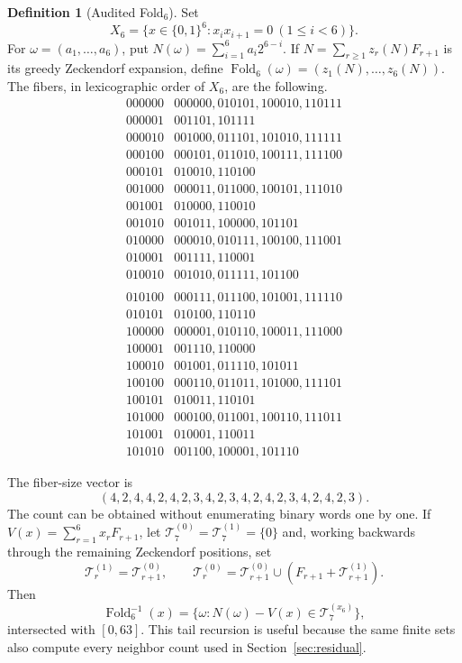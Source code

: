\documentclass[12pt,a4paper]{article}
\theoremstyle{plain}
\theoremstyle{definition}
\newtheorem{definition}[theorem]{Definition}
\numberwithin{equation}{section}
\newcommand{\Fold}{\operatorname{Fold}}
\begin{document}
\begin{definition}[Audited Fold$_6$]\label{def:fold6}
Set
\[
X_6=\{x\in\{0,1\}^6:x_ix_{i+1}=0\ (1\le i<6)\}.
\]
For \(\omega=(a_1,\ldots,a_6)\), put
\(N(\omega)=\sum_{i=1}^6a_i2^{6-i}\).  If
\(N=\sum_{r\ge1}z_r(N)F_{r+1}\) is its greedy Zeckendorf expansion, define
\(\Fold_6(\omega)=(z_1(N),\ldots,z_6(N))\).  The fibers, in lexicographic order of
\(X_6\), are the following.
\[
\begin{array}{c|l}
000000&000000,010101,100010,110111\\
000001&001101,101111\\
000010&001000,011101,101010,111111\\
000100&000101,011010,100111,111100\\
000101&010010,110100\\
001000&000011,011000,100101,111010\\
001001&010000,110010\\
001010&001011,100000,101101\\
010000&000010,010111,100100,111001\\
010001&001111,110001\\
010010&001010,011111,101100\\
\end{array}
\]
\[
\begin{array}{c|l}
010100&000111,011100,101001,111110\\
010101&010100,110110\\
100000&000001,010110,100011,111000\\
100001&001110,110000\\
100010&001001,011110,101011\\
100100&000110,011011,101000,111101\\
100101&010011,110101\\
101000&000100,011001,100110,111011\\
101001&010001,110011\\
101010&001100,100001,101110
\end{array}
\]
\end{definition}

The fiber-size vector is
\[
(4,2,4,4,2,4,2,3,4,2,3,4,2,4,2,3,4,2,4,2,3).
\]
The count can be obtained without enumerating binary words one by one.  If
\(V(x)=\sum_{r=1}^6x_rF_{r+1}\), let \(\mathcal T_7^{(0)}=\mathcal T_7^{(1)}=\{0\}\)
and, working backwards through the remaining Zeckendorf positions, set
\[
\mathcal T_r^{(1)}=\mathcal T_{r+1}^{(0)},\qquad
\mathcal T_r^{(0)}=\mathcal T_{r+1}^{(0)}\cup
 (F_{r+1}+\mathcal T_{r+1}^{(1)}).
\]
Then
\[
\Fold_6^{-1}(x)=\{\omega:N(\omega)-V(x)\in\mathcal T_7^{(x_6)}\},
\]
intersected with \([0,63]\).  This tail recursion is useful because the same finite sets
also compute every neighbor count used in Section~\ref{sec:residual}.
\end{document}
